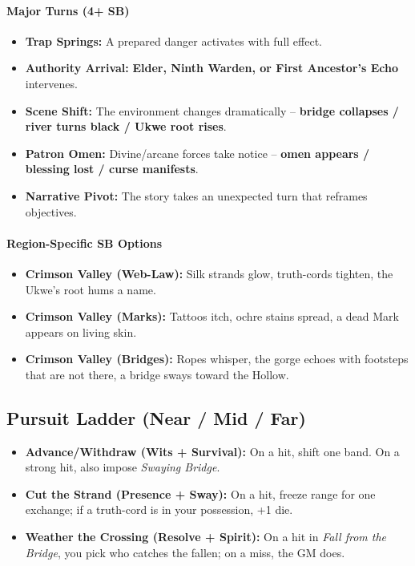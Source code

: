 \paragraph{Major Turns (4+ SB)}
\begin{itemize}
\item \textbf{Trap Springs:} A prepared danger activates with full effect.
\item \textbf{Authority Arrival:} \textbf{Elder, Ninth Warden, or First Ancestor's Echo} intervenes.
\item \textbf{Scene Shift:} The environment changes dramatically -- \textbf{bridge collapses / river turns black / Ukwe root rises}.
\item \textbf{Patron Omen:} Divine/arcane forces take notice -- \textbf{omen appears / blessing lost / curse manifests}.
\item \textbf{Narrative Pivot:} The story takes an unexpected turn that reframes objectives.
\end{itemize}

\paragraph{Region-Specific SB Options}
\begin{itemize}
\item \textbf{Crimson Valley (Web-Law):} Silk strands glow, truth-cords tighten, the Ukwe's root hums a name.
\item \textbf{Crimson Valley (Marks):} Tattoos itch, ochre stains spread, a dead Mark appears on living skin.
\item \textbf{Crimson Valley (Bridges):} Ropes whisper, the gorge echoes with footsteps that are not there, a bridge sways toward the Hollow.
\end{itemize}

\subsection*{Pursuit Ladder (Near / Mid / Far)}
\begin{itemize}
\item \textbf{Advance/Withdraw (Wits + Survival):} On a hit, shift one band. On a strong hit, also impose \emph{Swaying Bridge}.
\item \textbf{Cut the Strand (Presence + Sway):} On a hit, freeze range for one exchange; if a truth-cord is in your possession, +1 die.
\item \textbf{Weather the Crossing (Resolve + Spirit):} On a hit in \emph{Fall from the Bridge}, you pick who catches the fallen; on a miss, the GM does.
\end{itemize}

